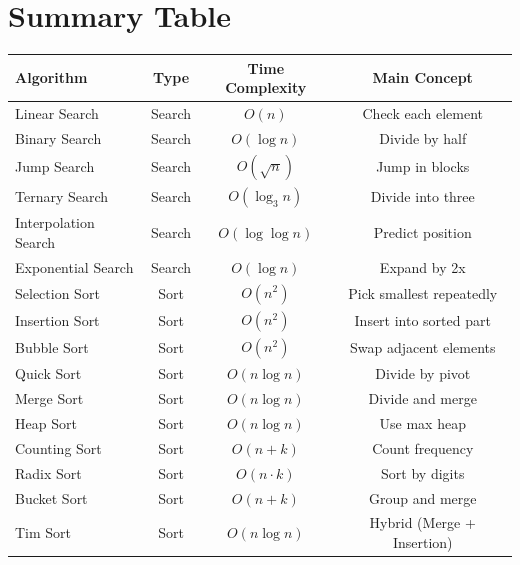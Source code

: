 \documentclass[a4paper,12pt]{article}
\begin{document}
\section{Summary Table}

\begin{center}
\begin{tabular}{lccc}
\toprule
\textbf{Algorithm} & \textbf{Type} & \textbf{Time Complexity} & \textbf{Main Concept} \\
\midrule
Linear Search & Search & $O(n)$ & Check each element \\
Binary Search & Search & $O(\log n)$ & Divide by half \\
Jump Search & Search & $O(\sqrt{n})$ & Jump in blocks \\
Ternary Search & Search & $O(\log_3 n)$ & Divide into three \\
Interpolation Search & Search & $O(\log \log n)$ & Predict position \\
Exponential Search & Search & $O(\log n)$ & Expand by 2x \\
\midrule
Selection Sort & Sort & $O(n^2)$ & Pick smallest repeatedly \\
Insertion Sort & Sort & $O(n^2)$ & Insert into sorted part \\
Bubble Sort & Sort & $O(n^2)$ & Swap adjacent elements \\
Quick Sort & Sort & $O(n \log n)$ & Divide by pivot \\
Merge Sort & Sort & $O(n \log n)$ & Divide and merge \\
Heap Sort & Sort & $O(n \log n)$ & Use max heap \\
Counting Sort & Sort & $O(n + k)$ & Count frequency \\
Radix Sort & Sort & $O(n \cdot k)$ & Sort by digits \\
Bucket Sort & Sort & $O(n + k)$ & Group and merge \\
Tim Sort & Sort & $O(n \log n)$ & Hybrid (Merge + Insertion) \\
\bottomrule
\end{tabular}
\end{center}
\end{document}
